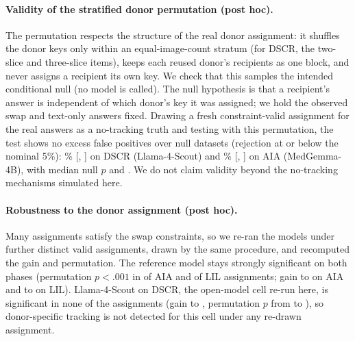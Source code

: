 \documentclass[11pt]{article}
\begin{document}
\paragraph{Validity of the stratified donor permutation (post hoc).} The permutation respects the structure of the real donor assignment: it shuffles the donor keys only within an equal-image-count stratum (for DSCR, the \vfourStratDSCRTwo{} two-slice and \vfourStratDSCRThree{} three-slice items), keeps each reused donor's recipients as one block, and never assigns a recipient its own key. We check that this samples the intended conditional null (no model is called). The null hypothesis is that a recipient's answer is independent of which donor's key it was assigned; we hold the observed swap and text-only answers fixed. Drawing a fresh constraint-valid assignment for the real answers as a no-tracking truth and testing with this permutation, the test shows no excess false positives over \vfourStratSims{} null datasets (rejection at or below the nominal 5\%): \vfourStratTypeIDSCRScout{}\% [\vfourStratTypeILoDSCRScout{}, \vfourStratTypeIHiDSCRScout{}] on DSCR (Llama-4-Scout) and \vfourStratTypeIAIAMedGemma{}\% [\vfourStratTypeILoAIAMedGemma{}, \vfourStratTypeIHiAIAMedGemma{}] on AIA (MedGemma-4B), with median null $p$ \vfourStratMedPDSCRScout{} and \vfourStratMedPAIAMedGemma{}. We do not claim validity beyond the no-tracking mechanisms simulated here.

\paragraph{Robustness to the donor assignment (post hoc).} Many assignments satisfy the swap constraints, so we re-ran the models under \vfourRobustGeminiNAssign{} further distinct valid assignments, drawn by the same procedure, and recomputed the gain and permutation. The reference model stays strongly significant on both phases (permutation $p<.001$ in \vfourRobustGeminiAIANSig{} of \vfourRobustGeminiNAssign{} AIA and \vfourRobustGeminiLILNSig{} of \vfourRobustGeminiNAssign{} LIL assignments; gain \vfourRobustGeminiAIAGainMin{} to \vfourRobustGeminiAIAGainMax{} on AIA and \vfourRobustGeminiLILGainMin{} to \vfourRobustGeminiLILGainMax{} on LIL). Llama-4-Scout on DSCR, the open-model cell re-run here, is significant in none of the \vfourRobustScoutNAssign{} assignments (gain \vfourRobustScoutDSCRGainMin{} to \vfourRobustScoutDSCRGainMax{}, permutation $p$ from \vfourRobustScoutDSCRPermPMin{} to \vfourRobustScoutDSCRPermPMax{}), so donor-specific tracking is not detected for this cell under any re-drawn assignment.
\end{document}
